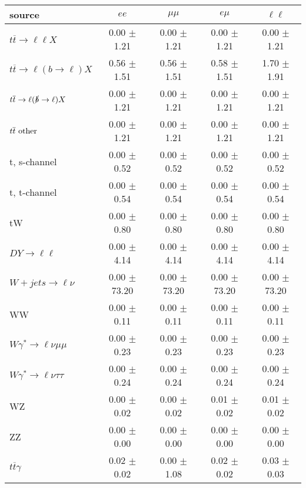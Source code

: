 \begin{tabular}{l|cccc} \hline\hline
source & $ee$ & $\mu\mu$ & $e\mu$ & $\ell\ell $ \\
\hline
$t\overline{t} \rightarrow \ell \ell X$ &  0.00 $\pm$  1.21 &  0.00 $\pm$  1.21 &  0.00 $\pm$  1.21 &  0.00 $\pm$  1.21 \\
$t\overline{t} \rightarrow \ell (b \rightarrow \ell) X$ &  0.56 $\pm$  1.51 &  0.56 $\pm$  1.51 &  0.58 $\pm$  1.51 &  1.70 $\pm$  1.91 \\
$t\overline{t} \rightarrow \ell (\slashed b \rightarrow \ell) X$ &  0.00 $\pm$  1.21 &  0.00 $\pm$  1.21 &  0.00 $\pm$  1.21 &  0.00 $\pm$  1.21 \\
        $t\overline{t}\ \rm{other}$ &  0.00 $\pm$  1.21 &  0.00 $\pm$  1.21 &  0.00 $\pm$  1.21 &  0.00 $\pm$  1.21 \\
\hline
                       t, s-channel &  0.00 $\pm$  0.52 &  0.00 $\pm$  0.52 &  0.00 $\pm$  0.52 &  0.00 $\pm$  0.52 \\
                       t, t-channel &  0.00 $\pm$  0.54 &  0.00 $\pm$  0.54 &  0.00 $\pm$  0.54 &  0.00 $\pm$  0.54 \\
                                 tW &  0.00 $\pm$  0.80 &  0.00 $\pm$  0.80 &  0.00 $\pm$  0.80 &  0.00 $\pm$  0.80 \\
\hline
         $DY \rightarrow \ell \ell$ &  0.00 $\pm$  4.14 &  0.00 $\pm$  4.14 &  0.00 $\pm$  4.14 &  0.00 $\pm$  4.14 \\
      $W+jets \rightarrow \ell \nu$ &  0.00 $\pm$ 73.20 &  0.00 $\pm$ 73.20 &  0.00 $\pm$ 73.20 &  0.00 $\pm$ 73.20 \\
                                 WW &  0.00 $\pm$  0.11 &  0.00 $\pm$  0.11 &  0.00 $\pm$  0.11 &  0.00 $\pm$  0.11 \\
\hline
$W\gamma^{*} \rightarrow \ell \nu \mu\mu$ &  0.00 $\pm$  0.23 &  0.00 $\pm$  0.23 &  0.00 $\pm$  0.23 &  0.00 $\pm$  0.23 \\
$W\gamma^{*} \rightarrow \ell \nu \tau\tau$ &  0.00 $\pm$  0.24 &  0.00 $\pm$  0.24 &  0.00 $\pm$  0.24 &  0.00 $\pm$  0.24 \\
                                 WZ &  0.00 $\pm$  0.02 &  0.00 $\pm$  0.02 &  0.01 $\pm$  0.02 &  0.01 $\pm$  0.02 \\
                                 ZZ &  0.00 $\pm$  0.00 &  0.00 $\pm$  0.00 &  0.00 $\pm$  0.00 &  0.00 $\pm$  0.00 \\
\hline
              $t\overline{t}\gamma$ &  0.02 $\pm$  0.02 &  0.00 $\pm$  1.08 &  0.02 $\pm$  0.02 &  0.03 $\pm$  0.03 \\

\end{tabular}
